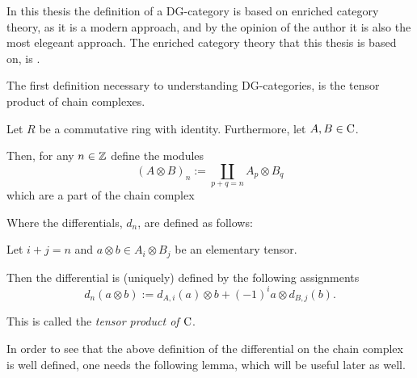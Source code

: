 In this thesis the definition of a DG-category is based on enriched category theory, as it is a modern approach, and by the opinion of the author it is also the most elegeant approach. The enriched category theory that this thesis is based on, is \cite[Section 6.2]{Borceux_1994}.

The first definition necessary to understanding DG-categories, is the tensor product of chain complexes.

\begin{definition}
    \label{def:tensor_product_of_chain_complexes_over_Mod(R)}
    Let \( R \) be a commutative ring with identity. Furthermore, let \( A, B \in \operatorname{C} \).

    Then, for any  \( n \in {\mathbb{Z}} \) define the modules
    \[
        (A \otimes B)_n := \coprod_{p + q = n} A_p \otimes B_q
    \]
    which are a part of the chain complex
    \begin{center}
    \end{center}

    Where the differentials, \( d_n \), are defined as follows:
    
    Let \( i + j = n \) and \( a \otimes b \in A_i \otimes B_j \) be an elementary tensor.

    Then the differential is (uniquely) defined by the following assignments
    \[
        d_n(a \otimes b) := d_{A, i}(a) \otimes b + (-1)^{i} a \otimes d_{B, j}(b).
    \]

    This is called the \emph{tensor product of \( \operatorname{C} \)}.
\end{definition}

In order to see that the above definition of the differential on the chain complex is well defined, one needs the following lemma, which will be useful later as well.

